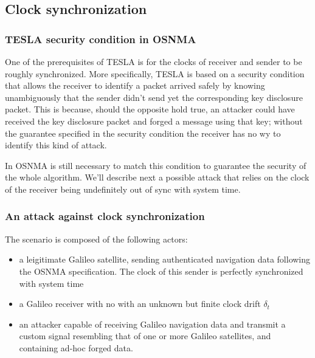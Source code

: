 \subsection{Clock synchronization}

\subsubsection{TESLA security condition in OSNMA}

One of the prerequisites of TESLA is for the clocks of receiver and sender to be
roughly synchronized. More specifically, TESLA is based on a security condition
that allows the receiver to identify a packet arrived safely by knowing
unambiguously that the sender didn't send yet the corresponding key disclosure
packet. This is because, should the opposite hold true, an attacker could have
received the key disclosure packet and forged a message using that key; without
the guarantee specified in the security condition the receiver has no wy to
identify this kind of attack.

In OSNMA is still necessary to match this condition to guarantee the security of
the whole algorithm. We'll describe next a possible attack that relies on the
clock of the receiver being undefinitely out of sync with system time.

\subsubsection{An attack against clock synchronization}
The scenario is composed of the following actors:
\begin{itemize}
  \item a leigitimate Galileo satellite, sending authenticated navigation data
    following the OSNMA specification. The clock of this sender is perfectly
    synchronized with system time
  \item a Galileo receiver with no with an unknown but finite clock drift
    $\delta_t$
  \item an attacker capable of receiving Galileo navigation data and transmit a
    custom signal resembling that of one or more Galileo satellites, and
    containing ad-hoc forged data.
\end{itemize}

